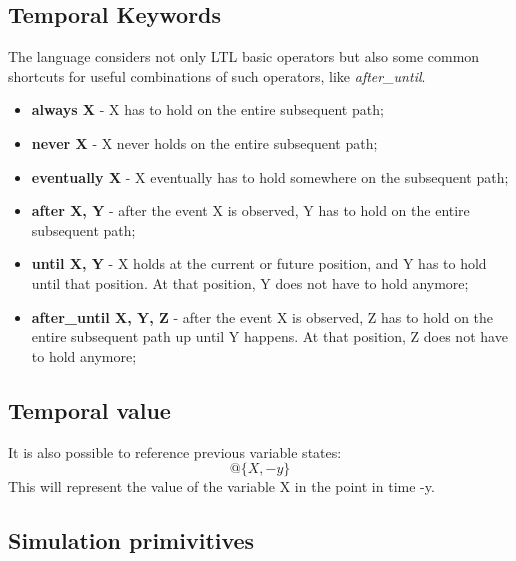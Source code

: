 \subsection{Temporal Keywords}
\label{ssec:tempkeywords}

The language considers not only LTL basic operators but also some common shortcuts for useful combinations of such operators, like \textit{after\_until}.

\begin{itemize}
\item {\bfseries always X} - X has to hold on the entire subsequent path;
\item {\bfseries never X} - X never holds on the entire subsequent path;
\item {\bfseries eventually X} - X eventually has to hold somewhere on the subsequent path;
\item {\bfseries after X, Y} - after the event X is observed, Y has to hold on the entire subsequent path;
\item {\bfseries until X, Y} - X holds at the current or future position, and Y has to hold until that position. At that position, Y does not have to hold anymore;
\item {\bfseries after\_until X, Y, Z} - after the event X is observed, Z has to hold on the entire subsequent path up until Y happens. At that position, Z does not have to hold anymore;
\end{itemize}


\subsection{Temporal value}
\label{ssec:tempvalues}


It is also possible to reference previous variable states:
\begin{equation}
@\{X, -y\}
\end{equation}
This will represent the value of the variable X in the point in time -y.


\subsection{Simulation primivitives}
\label{ssec:simprimitives}

